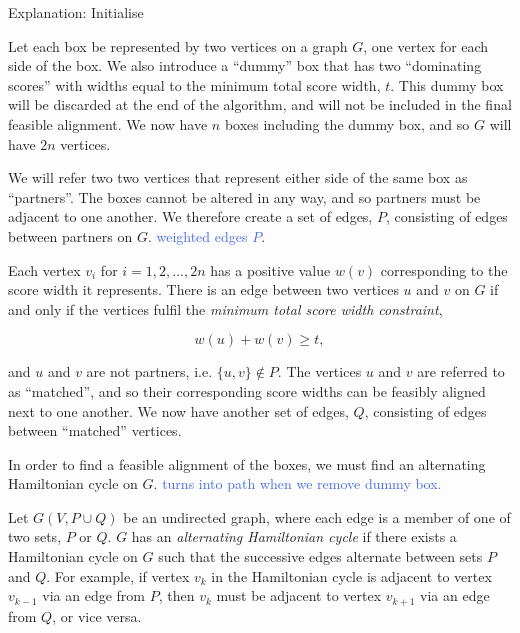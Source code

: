 \documentclass[oribibl]{llncs}
\begin{document}
Explanation: Initialise

Let each box be represented by two vertices on a graph $G$, one vertex for each side of the box. We also introduce a ``dummy'' box that has two ``dominating scores'' with widths equal to the minimum total score width, $t$. This dummy box will be discarded at the end of the algorithm, and will not be included in the final feasible alignment. We now have $n$ boxes including the dummy box, and so $G$ will have $2n$ vertices.

We will refer two two vertices that represent either side of the same box as ``partners''. The boxes cannot be altered in any way, and so partners must be adjacent to one another. We therefore create a set of edges, $P$, consisting of edges between partners on $G$. \textcolor{RoyalBlue}{weighted edges $P$}.

Each vertex $v_i$ for $i = 1, 2, ..., 2n$ has a positive value $w(v)$ corresponding to the score width it represents. There is an edge between two vertices $u$ and $v$ on $G$ if and only if the vertices fulfil the \textit{minimum total score width constraint}, 

\begin{equation*}
	\label{eqn:mtswcg}
	w(u) + w(v) \geq t,
\end{equation*}

and $u$ and $v$ are not partners, i.e. $\{u, v\} \notin P$. The vertices $u$ and $v$ are referred to as \textcolor{OliveGreen}{``matched''}, and so their corresponding score widths can be feasibly aligned next to one another. We now have another set of edges, $Q$, consisting of edges between \textcolor{OliveGreen}{``matched''} vertices.  

In order to find a feasible alignment of the boxes, we must find an alternating Hamiltonian cycle on $G$. \textcolor{RoyalBlue}{turns into path when we remove dummy box.}

\begin{definition}
	\label{defn:althamcycle}
	Let $G(V, P\cup Q)$ be an undirected graph, where each edge is a member of one of two sets, $P$ or $Q$. $G$ has an \textit{alternating Hamiltonian cycle} if there exists a Hamiltonian cycle on $G$ such that the successive edges alternate between sets $P$ and $Q$. For example, if vertex $v_k$ in the Hamiltonian cycle is adjacent to vertex $v_{k-1}$ via an edge from $P$, then $v_k$ must be adjacent to vertex $v_{k+1}$ via an edge from $Q$, or vice versa. 
\end{definition}
\end{document}

